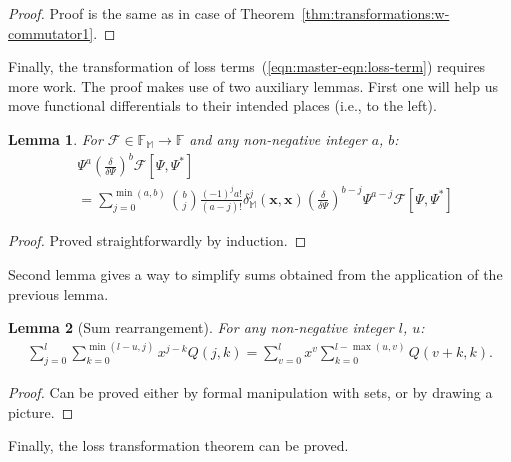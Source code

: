 \documentclass[12pt,aip,jmp,amssymb,amsmath]{revtex4-1}
\newcommand{\xvec}{\boldsymbol{x}}
\newcommand{\restbasis}{\mathbb{M}}
\newcommand{\eqnref}[1]{(\ref{eqn:#1})}
\newcommand{\thmref}[1]{Theorem~\ref{thm:#1}}
\newtheorem{lemma}{Lemma}
\begin{document}
\begin{proof}
Proof is the same as in case of \thmref{transformations:w-commutator1}.
\end{proof}

Finally, the transformation of loss terms~\eqnref{master-eqn:loss-term} requires more work.
The proof makes use of two auxiliary lemmas.
First one will help us move functional differentials to their intended places (i.e., to the left).

\begin{lemma}
\label{lmm:transformations:swap-differential}
    For $\mathcal{F} \in \mathbb{F}_{\restbasis} \rightarrow \mathbb{F}$ and any non-negative integer $a$, $b$:
    \begin{equation*}\begin{split}
    &    \Psi^a \left( \frac{\delta}{\delta \Psi} \right)^b \mathcal{F}[\Psi, \Psi^*] \\
    &    = \sum_{j=0}^{\min(a, b)}
            \binom{b}{j} \frac{(-1)^j a!}{(a - j)!}
            \delta_{\restbasis}^j(\xvec, \xvec)
            \left( \frac{\delta}{\delta \Psi} \right)^{b - j}
            \Psi^{a - j}
            \mathcal{F}[\Psi, \Psi^*]
    \end{split}\end{equation*}
\end{lemma}
\begin{proof}
Proved straightforwardly by induction.
\end{proof}

Second lemma gives a way to simplify sums obtained from the application of the previous lemma.

\begin{lemma}[Sum rearrangement]
\label{lmm:transformations:sum-rearrangement}
    For any non-negative integer $l$, $u$:
    \begin{equation*}\begin{split}
        \sum_{j=0}^l \sum_{k=0}^{\min(l-u,j)} x^{j-k} Q(j, k)
        = \sum_{v=0}^l x^v \sum_{k=0}^{l-\max(u,v)} Q(v + k, k).
    \end{split}\end{equation*}
\end{lemma}
\begin{proof}
Can be proved either by formal manipulation with sets, or by drawing a picture.
\end{proof}

Finally, the loss transformation theorem can be proved.
\end{document}
